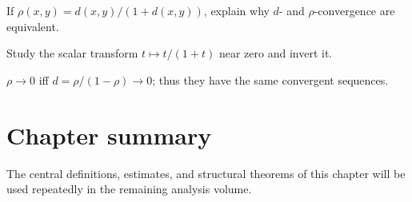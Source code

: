 \begin{exercise}\label{exr:ii05-expand-16}
If \(\rho(x,y)=d(x,y)/(1+d(x,y))\), explain why \(d\)- and \(\rho\)-convergence are equivalent.
\end{exercise}
\begin{hint}
Study the scalar transform \(t\mapsto t/(1+t)\) near zero and invert it.
\end{hint}
\begin{solution}
\(\rho\to0\) iff \(d=\rho/(1-\rho)\to0\); thus they have the same convergent sequences.
\end{solution}
\section*{Chapter summary}
The central definitions, estimates, and structural theorems of this chapter will be used repeatedly in the remaining analysis volume.
